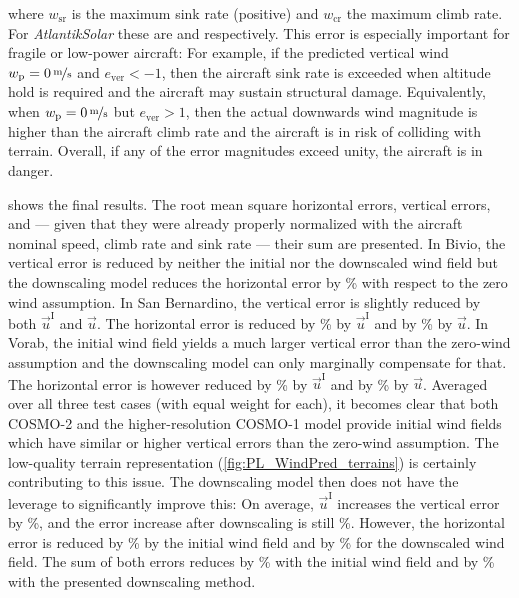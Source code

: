 \documentclass[twocolumn,letterpaper]{IEEEAerospaceCLS}
\begin{document}
where $w_\text{sr}$ is the maximum sink rate (positive) and $w_\text{cr}$ the maximum climb rate. For \emph{AtlantikSolar} these are  and  respectively. This error is especially important for fragile or low-power aircraft: For example, if the predicted vertical wind $w_\text{p}=\unitfrac[0]{m}{s}$ and $e_\text{ver}<-1$, then the aircraft sink rate is exceeded when altitude hold is required and the aircraft may sustain structural damage. Equivalently, when $w_\text{p}=\unitfrac[0]{m}{s}$ but $e_\text{ver}>1$, then the actual downwards wind magnitude is higher than the aircraft climb rate and the aircraft is in risk of colliding with terrain. Overall, if any of the error magnitudes exceed unity, the aircraft is in danger. 

 shows the final results. The root mean square horizontal errors, vertical errors, and --- given that they were already properly normalized with the aircraft nominal speed, climb rate and sink rate --- their sum are presented. In Bivio, the vertical error is reduced by neither the initial nor the downscaled wind field but the downscaling model reduces the horizontal error by \unit[38]{\%} with respect to the zero wind assumption. In San Bernardino, the vertical error is slightly reduced by both $\vec{u}^\text{I}$ and $\vec{u}$. The horizontal error is reduced by \unit[27]{\%} by $\vec{u}^\text{I}$ and by \unit[31]{\%} by $\vec{u}$. In Vorab, the initial wind field yields a much larger vertical error than the zero-wind assumption and the downscaling model can only marginally compensate for that. The horizontal error is however reduced by \unit[46]{\%} by $\vec{u}^\text{I}$ and by \unit[48]{\%} by $\vec{u}$. Averaged over all three test cases (with equal weight for each), it becomes clear that both COSMO-2 and the higher-resolution COSMO-1 model provide initial wind fields which have similar or higher vertical errors than the zero-wind assumption. The low-quality terrain representation (\cref{fig:PL_WindPred_terrains}) is certainly contributing to this issue. The downscaling model then does not have the leverage to significantly improve this: On average, $\vec{u}^\text{I}$ increases the vertical error by \unit[30]{\%}, and the error increase after downscaling is still \unit[26]{\%}. However, the horizontal error is reduced by \unit[31]{\%} by the initial wind field and by \unit[41]{\%} for the downscaled wind field. The sum of both errors reduces by \unit[15]{\%} with the initial wind field and by \unit[23]{\%} with the presented downscaling method.
\end{document}
